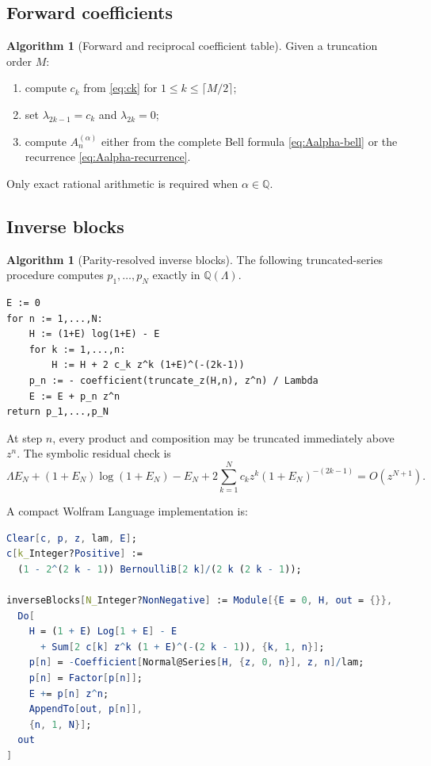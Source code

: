 \documentclass[11pt,oneside]{article}
\theoremstyle{plain}
\theoremstyle{definition}
\newtheorem{algorithm}[theorem]{Algorithm}
\theoremstyle{remark}
\newcommand{\Q}{\mathbb Q}
\begin{document}
\subsection{Forward coefficients}

\begin{algorithm}[Forward and reciprocal coefficient table]
\label{alg:forward}
Given a truncation order \(M\):
\begin{enumerate}
\item compute \(c_k\) from \cref{eq:ck} for
      \(1\le k\le\lceil M/2\rceil\);
\item set \(\lambda_{2k-1}=c_k\) and \(\lambda_{2k}=0\);
\item compute \(A_n^{(\alpha)}\) either from the complete Bell formula
      \cref{eq:Aalpha-bell} or the recurrence
      \cref{eq:Aalpha-recurrence}.
\end{enumerate}
Only exact rational arithmetic is required when \(\alpha\in\Q\).
\end{algorithm}

\subsection{Inverse blocks}

\begin{algorithm}[Parity-resolved inverse blocks]
\label{alg:inverse}
The following truncated-series procedure computes
\(p_1,\ldots,p_N\) exactly in \(\Q(\Lambda)\).
\begin{lstlisting}
E := 0
for n := 1,...,N:
    H := (1+E) log(1+E) - E
    for k := 1,...,n:
        H := H + 2 c_k z^k (1+E)^(-(2k-1))
    p_n := - coefficient(truncate_z(H,n), z^n) / Lambda
    E := E + p_n z^n
return p_1,...,p_N
\end{lstlisting}
At step \(n\), every product and composition may be truncated immediately
above \(z^n\).  The symbolic residual check is
\begin{equation}
 \Lambda E_N+(1+E_N)\log(1+E_N)-E_N
 +2\sum_{k=1}^{N}c_kz^k(1+E_N)^{-(2k-1)}
 =O(z^{N+1}).
 \label{eq:symbolic-residual-check}
\end{equation}
\end{algorithm}

A compact Wolfram Language implementation is:
\begin{lstlisting}[language=Mathematica]
Clear[c, p, z, lam, E];
c[k_Integer?Positive] :=
  (1 - 2^(2 k - 1)) BernoulliB[2 k]/(2 k (2 k - 1));

inverseBlocks[N_Integer?NonNegative] := Module[{E = 0, H, out = {}},
  Do[
    H = (1 + E) Log[1 + E] - E
      + Sum[2 c[k] z^k (1 + E)^(-(2 k - 1)), {k, 1, n}];
    p[n] = -Coefficient[Normal@Series[H, {z, 0, n}], z, n]/lam;
    p[n] = Factor[p[n]];
    E += p[n] z^n;
    AppendTo[out, p[n]],
    {n, 1, N}];
  out
]
\end{lstlisting}
\end{document}
